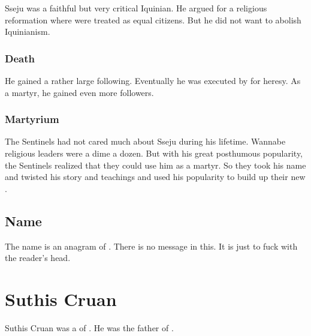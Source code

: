 Sseju was a faithful but very critical Iquinian.
He argued for a religious reformation where \scathae were treated as equal citizens. 
But he did not want to abolish Iquinianism.





\subsubsection{Death}
He gained a rather large following. 
Eventually he was executed by \Caliph \VizicarDurasRespina for heresy. 
As a martyr, he gained even more followers. 





\subsubsection{Martyrium}
The Sentinels had not cared much about Sseju during his lifetime. 
Wannabe religious leaders were a dime a dozen.
But with his great posthumous popularity, the Sentinels realized that they could use him as a martyr.
So they took his name and twisted his story and teachings and used his popularity to build up their new . 









\subsection{Name}
The name  is an anagram of .
There is no message in this.
It is just to fuck with the reader's head. 















\section{Suthis Cruan}
Suthis Cruan was a \rethyax \scatha of \Yormis.
He was the father of . 















